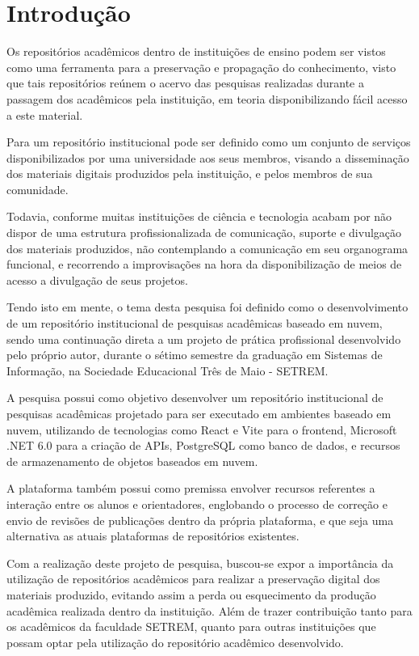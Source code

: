 \chapter*{Introdução} \label{chap:intro}

Os repositórios acadêmicos dentro de instituições de ensino
podem ser vistos como uma ferramenta para a preservação
e propagação do conhecimento, visto que tais repositórios reúnem
o acervo das pesquisas realizadas durante a passagem dos acadêmicos
pela instituição, em teoria disponibilizando fácil acesso a este
material.

Para \cite{LYNCH:2003} um repositório institucional pode
ser definido como um conjunto de serviços disponibilizados
por uma universidade aos seus membros, visando a disseminação
dos materiais digitais produzidos pela instituição, e pelos
membros de sua comunidade.

Todavia, conforme \cite{PORTO:difusao_cientifica_recortes}
muitas instituições de ciência e tecnologia acabam por não
dispor de uma estrutura profissionalizada de comunicação,
suporte e divulgação dos materiais produzidos, não contemplando
a comunicação em seu organograma funcional, e recorrendo a
improvisações na hora da disponibilização de meios de acesso
a divulgação de seus projetos.

Tendo isto em mente, o tema desta pesquisa foi definido como
o desenvolvimento de um repositório institucional de pesquisas
acadêmicas baseado em nuvem, sendo uma continuação direta a um
projeto de prática profissional desenvolvido pelo próprio autor,
durante o sétimo semestre da graduação em Sistemas de Informação, na
Sociedade Educacional Três de Maio - SETREM.

A pesquisa possui como objetivo desenvolver um repositório institucional
de pesquisas acadêmicas projetado para ser executado em ambientes
baseado em nuvem, utilizando de tecnologias como React e Vite para o
frontend, Microsoft .NET 6.0 para a criação de APIs, PostgreSQL como banco
de dados, e recursos de armazenamento de objetos baseados em nuvem.

A plataforma também possui como premissa envolver recursos referentes
a interação entre os alunos e orientadores, englobando o processo de correção
e envio de revisões de publicações dentro da própria plataforma, e que seja
uma alternativa as atuais plataformas de repositórios existentes.

Com a realização deste projeto de pesquisa, buscou-se expor a
importância da utilização de repositórios acadêmicos para realizar
a preservação digital dos materiais produzido, evitando assim a perda
ou esquecimento da produção acadêmica realizada dentro da instituição.
Além de trazer contribuição tanto para os acadêmicos da faculdade SETREM, quanto para outras
instituições que possam optar pela utilização do repositório
acadêmico desenvolvido.

